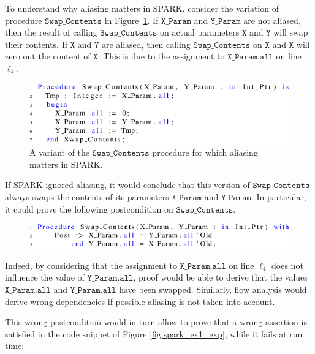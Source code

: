 \documentclass{llncs}
\newcommand\var[1]{\ensuremath{\mathtt{#1}}}
\begin{document}
To understand why aliasing matters in SPARK, consider the variation of procedure \var{Swap\_Contents} in Figure~\ref{fig:spark_ex1}. If \var{X\_Param} and \var{Y\_Param}
are not aliased, then the result of calling \var{Swap\_Contents} on actual parameters \var{X} and \var{Y} will swap their contents. If \var{X} and \var{Y} are aliased, then calling
\var{Swap\_Contents} on \var{X} and \var{X} will zero out the content of \var{X}. This is due to the assignment to \var{X\_Param.all} on line $\ell_4$.


\begin{figure}[htb!]
\centering
  \captionsetup{justification=centering,margin=0.6cm}
   \includegraphics[]{spark_ex1}
   \caption{A variant of the \var{Swap\_Contents} procedure for which aliasing matters in SPARK.}
   \label{fig:spark_ex1}
\end{figure}

If SPARK ignored aliasing, it would conclude that this version of \var{Swap\_Contents} always swaps the contents of its parameters \var{X\_Param} and \var{Y\_Param}.
In particular, it could prove the following postcondition on \var{Swap\_Contents}.

\begin{figure}[htb!]
\centering
  \captionsetup{justification=centering,margin=0.6cm}
   \includegraphics[]{spark_ex1_proof}
   \label{fig:spark_ex1_proof}
\end{figure}

Indeed, by considering that the assignment to \var{X\_Param.all} on line $\ell_4$ does not influence the value of \var{Y\_Param.all}, proof would be able to
derive that the values \var{X\_Param.all} and \var{Y\_Param.all} have been swapped. Similarly, flow analysis would derive wrong dependencies if possible aliasing is not taken into account.

This wrong postcondition would in turn allow to prove that a wrong assertion is satisfied in the code snippet of Figure \ref{fig:spark_ex1_exp}, while it fails at run time:
\end{document}
